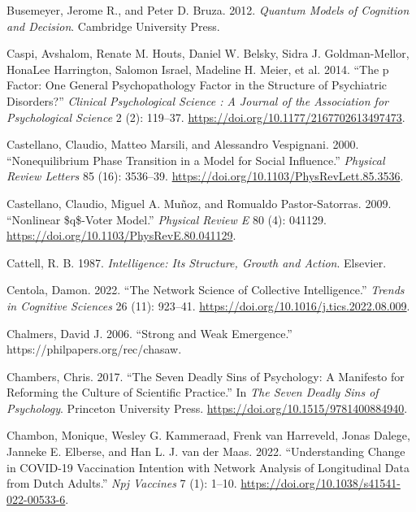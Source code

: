 \documentclass[
  letterpaper,
]{scrbook}
\newlength{\cslhangindent}
\newlength{\cslentryspacingunit} %
\newenvironment{CSLReferences}[2] %
 {%
  \setlength{\parindent}{0pt}
  \ifodd #1
  \let\oldpar\par
  \def\par{\hangindent=\cslhangindent\oldpar}
  \fi
  \setlength{\parskip}{#2\cslentryspacingunit}
 }%
 {}
\begin{document}
\begin{CSLReferences}{1}{0}
\leavevmode{}%
Busemeyer, Jerome R., and Peter D. Bruza. 2012. \emph{Quantum {Models}
of {Cognition} and {Decision}}. {Cambridge University Press}.

\leavevmode{}%
Caspi, Avshalom, Renate M. Houts, Daniel W. Belsky, Sidra J.
Goldman-Mellor, HonaLee Harrington, Salomon Israel, Madeline H. Meier,
et al. 2014. {``The p {Factor}: {One General Psychopathology Factor} in
the {Structure} of {Psychiatric Disorders}?''} \emph{Clinical
Psychological Science : A Journal of the Association for Psychological
Science} 2 (2): 119--37. \url{https://doi.org/10.1177/2167702613497473}.

\leavevmode{}%
Castellano, Claudio, Matteo Marsili, and Alessandro Vespignani. 2000.
{``Nonequilibrium {Phase Transition} in a {Model} for {Social
Influence}.''} \emph{Physical Review Letters} 85 (16): 3536--39.
\url{https://doi.org/10.1103/PhysRevLett.85.3536}.

\leavevmode{}%
Castellano, Claudio, Miguel A. Muñoz, and Romualdo Pastor-Satorras.
2009. {``Nonlinear \$q\$-Voter Model.''} \emph{Physical Review E} 80
(4): 041129. \url{https://doi.org/10.1103/PhysRevE.80.041129}.

\leavevmode{}%
Cattell, R. B. 1987. \emph{Intelligence: {Its Structure}, {Growth} and
{Action}}. {Elsevier}.

\leavevmode{}%
Centola, Damon. 2022. {``The Network Science of Collective
Intelligence.''} \emph{Trends in Cognitive Sciences} 26 (11): 923--41.
\url{https://doi.org/10.1016/j.tics.2022.08.009}.

\leavevmode{}%
Chalmers, David J. 2006. {``Strong and Weak Emergence.''}
https://philpapers.org/rec/chasaw.

\leavevmode{}%
Chambers, Chris. 2017. {``The {Seven Deadly Sins} of {Psychology}: {A
Manifesto} for {Reforming} the {Culture} of {Scientific Practice}.''} In
\emph{The {Seven Deadly Sins} of {Psychology}}. {Princeton University
Press}. \url{https://doi.org/10.1515/9781400884940}.

\leavevmode{}%
Chambon, Monique, Wesley G. Kammeraad, Frenk van Harreveld, Jonas
Dalege, Janneke E. Elberse, and Han L. J. van der Maas. 2022.
{``Understanding Change in {COVID-19} Vaccination Intention with Network
Analysis of Longitudinal Data from {Dutch} Adults.''} \emph{Npj
Vaccines} 7 (1): 1--10.
\url{https://doi.org/10.1038/s41541-022-00533-6}.


\end{CSLReferences}
\end{document}
